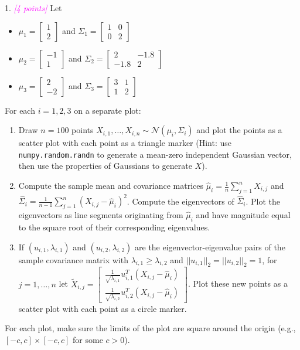 \documentclass{article}
\newcommand{\1}{\mathbf{1}}
\newcommand{\grade}[1]{\small\textcolor{magenta}{\emph{[#1 points]}} \normalsize}
\begin{document}
1. \grade{4} Let 
\begin{itemize}
\item $\mu_1 = \begin{bmatrix} 1 \\ 2 \end{bmatrix}$ and $\Sigma_1 = \begin{bmatrix} 1 & 0 \\ 0 & 2 \end{bmatrix}$
\item $\mu_2 = \begin{bmatrix} -1 \\ 1 \end{bmatrix}$ and $\Sigma_2 = \begin{bmatrix} 2 & -1.8 \\ -1.8 & 2 \end{bmatrix}$
\item $\mu_3 = \begin{bmatrix} 2 \\ -2 \end{bmatrix}$ and $\Sigma_3 = \begin{bmatrix} 3 & 1 \\ 1 & 2 \end{bmatrix}$
\end{itemize}
For each $i=1,2,3$ on a separate plot:
\begin{enumerate}
  \item Draw $n=100$ points $X_{i,1},\dots,X_{i,n} \sim \mathcal{N}(\mu_i, \Sigma_i)$ and plot the points as a scatter plot with each point as a triangle marker (Hint: use \texttt{numpy.random.randn} to generate a mean-zero independent Gaussian vector, then use the properties of Gaussians to generate $X$).
  \item Compute the sample mean and covariance matrices $\widehat{\mu}_i = \frac{1}{n} \sum_{j=1}^n X_{i,j}$ and $\widehat{\Sigma}_i = \frac{1}{n-1} \sum_{j=1}^n (X_{i,j} - \widehat{\mu}_i)^2$. 
  Compute the eigenvectors of $\widehat{\Sigma}_i$. Plot the eigenvectors as line segments originating from $\widehat{\mu}_i$ and have magnitude equal to the square root of their corresponding eigenvalues.
  \item If $(u_{i,1},\lambda_{i,1})$ and $(u_{i,2},\lambda_{i,2})$ are the eigenvector-eigenvalue pairs of the sample covariance matrix with $\lambda_{i,1} \geq \lambda_{i,2}$ and $||u_{i,1}||_2 = ||u_{i,2}||_2 = 1$, for $j=1,\dots,n$ let $\widetilde{X}_{i,j} = \begin{bmatrix} \frac{1}{\sqrt{\lambda_{i,1}}} u_{i,1}^T (X_{i,j} - \widehat{\mu}_i) \\ \frac{1}{\sqrt{\lambda_{i,2}}} u_{i,2}^T (X_{i,j} - \widehat{\mu}_i)  \end{bmatrix}$. Plot these new points as a scatter plot with each point as a circle marker. 
\end{enumerate}
For each plot, make sure the limits of the plot are square around the origin (e.g., $[-c,c] \times [-c,c]$ for some $c > 0$).\\
\end{document}
